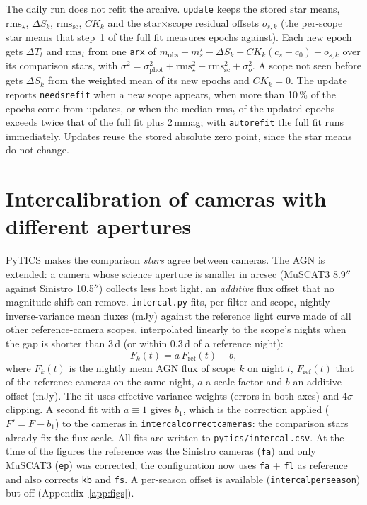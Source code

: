 \documentclass[10pt,a4paper,oneside]{report}
\renewcommand{\_}{\oldunderscore\allowbreak}
\begin{document}
The daily run does not refit the archive. \texttt{update} keeps the stored star means, $\mathrm{rms}_\star$,
$\Delta S_k$, $\mathrm{rms}_\mathrm{sc}$, $CK_k$ and the star$\times$scope residual offsets $o_{s,k}$
(the per-scope star means that step~1 of the full fit measures epochs against). Each new epoch gets
$\Delta T_t$ and $\mathrm{rms}_t$ from one \texttt{arx} of
$m_\mathrm{obs} - m^\star_s - \Delta S_k - CK_k(c_s-c_0) - o_{s,k}$ over its comparison stars, with
$\sigma^2 = \sigma_\mathrm{phot}^2 + \mathrm{rms}_\star^2 + \mathrm{rms}_\mathrm{sc}^2 + \sigma_o^2$.
A scope not seen before gets $\Delta S_k$ from the weighted mean of its new epochs and $CK_k = 0$.
The update reports \texttt{needs\_refit} when a new scope appears, when more than 10\,\% of the epochs
come from updates, or when the median $\mathrm{rms}_t$ of the updated epochs exceeds twice that of the
full fit plus 2\,mmag; with \texttt{auto\_refit} the full fit runs immediately. Updates reuse the stored
absolute zero point, since the star means do not change.

\section{Intercalibration of cameras with different apertures}
\label{sec:intercal}

PyTICS makes the comparison \emph{stars} agree between cameras. The AGN is extended: a camera whose
science aperture is smaller in arcsec (MuSCAT3 8.9$''$ against Sinistro 10.5$''$) collects less host
light, an \emph{additive} flux offset that no magnitude shift can remove. \texttt{intercal.py} fits, per
filter and scope, nightly inverse-variance mean fluxes (mJy) against the reference light curve made of
all other reference-camera scopes, interpolated linearly to the scope's nights when the gap is shorter
than 3\,d (or within 0.3\,d of a reference night):
\begin{equation}
  F_k(t) = a\,F_\mathrm{ref}(t) + b ,
\end{equation}
where $F_k(t)$ is the nightly mean AGN flux of scope $k$ on night $t$, $F_\mathrm{ref}(t)$ that of the
reference cameras on the same night, $a$ a scale factor and $b$ an additive offset (mJy). The fit uses
effective-variance weights (errors in both axes) and 4$\sigma$ clipping. A second fit with $a\equiv1$ gives $b_1$, which
is the correction applied ($F' = F - b_1$) to the cameras in \texttt{intercal\_correct\_cameras}: the
comparison stars already fix the flux scale. All fits are written to \texttt{pytics/intercal.csv}.
At the time of the figures the reference was the Sinistro cameras (\texttt{fa}) and only MuSCAT3
(\texttt{ep}) was corrected; the configuration now uses \texttt{fa} + \texttt{fl} as reference and also
corrects \texttt{kb} and \texttt{fs}. A per-season offset is available (\texttt{intercal\_per\_season})
but off (Appendix~\ref{app:figs}).
\end{document}
